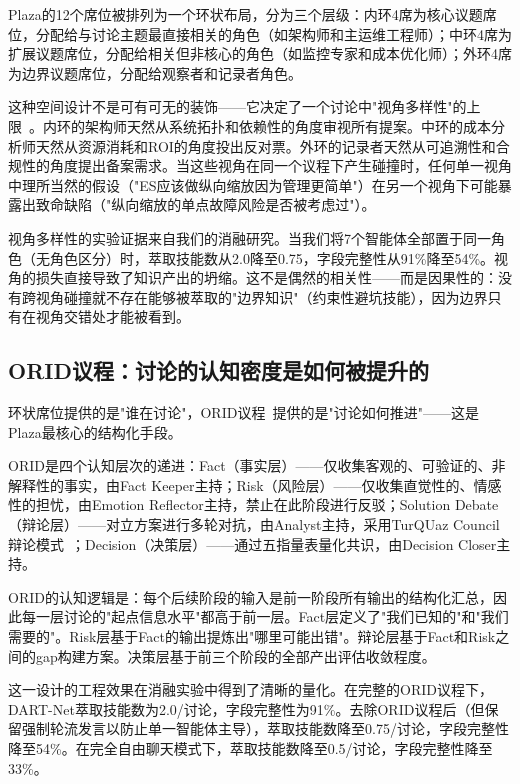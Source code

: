\documentclass[twocolumn,10.5pt]{ctexart}
\begin{document}
Plaza的12个席位被排列为一个环状布局，分为三个层级：内环4席为核心议题席位，分配给与讨论主题最直接相关的角色（如架构师和主运维工程师）；中环4席为扩展议题席位，分配给相关但非核心的角色（如监控专家和成本优化师）；外环4席为边界议题席位，分配给观察者和记录者角色。

这种空间设计不是可有可无的装饰——它决定了一个讨论中"视角多样性"的上限~\cite{gungor2025turquaz}。内环的架构师天然从系统拓扑和依赖性的角度审视所有提案。中环的成本分析师天然从资源消耗和ROI的角度投出反对票。外环的记录者天然从可追溯性和合规性的角度提出备案需求。当这些视角在同一个议程下产生碰撞时，任何单一视角中理所当然的假设（"ES应该做纵向缩放因为管理更简单"）在另一个视角下可能暴露出致命缺陷（"纵向缩放的单点故障风险是否被考虑过"）。

视角多样性的实验证据来自我们的消融研究。当我们将7个智能体全部置于同一角色（无角色区分）时，萃取技能数从2.0降至0.75，字段完整性从91\%降至54\%。视角的损失直接导致了知识产出的坍缩。这不是偶然的相关性——而是因果性的：没有跨视角碰撞就不存在能够被萃取的"边界知识"（约束性避坑技能），因为边界只有在视角交错处才能被看到。

\subsection{ORID议程：讨论的认知密度是如何被提升的}

环状席位提供的是"谁在讨论"，ORID议程~\cite{kaner2014facilitator}提供的是"讨论如何推进"——这是Plaza最核心的结构化手段。

ORID是四个认知层次的递进：Fact（事实层）——仅收集客观的、可验证的、非解释性的事实，由Fact Keeper主持；Risk（风险层）——仅收集直觉性的、情感性的担忧，由Emotion Reflector主持，禁止在此阶段进行反驳；Solution Debate（辩论层）——对立方案进行多轮对抗，由Analyst主持，采用TurQUaz Council辩论模式~\cite{gungor2025turquaz}；Decision（决策层）——通过五指量表量化共识，由Decision Closer主持。

ORID的认知逻辑是：每个后续阶段的输入是前一阶段所有输出的结构化汇总，因此每一层讨论的"起点信息水平"都高于前一层。Fact层定义了"我们已知的"和"我们需要的"。Risk层基于Fact的输出提炼出"哪里可能出错"。辩论层基于Fact和Risk之间的gap构建方案。决策层基于前三个阶段的全部产出评估收敛程度。

这一设计的工程效果在消融实验中得到了清晰的量化。在完整的ORID议程下，DART-Net萃取技能数为2.0/讨论，字段完整性为91\%。去除ORID议程后（但保留强制轮流发言以防止单一智能体主导），萃取技能数降至0.75/讨论，字段完整性降至54\%。在完全自由聊天模式下，萃取技能数降至0.5/讨论，字段完整性降至33\%。
\end{document}
